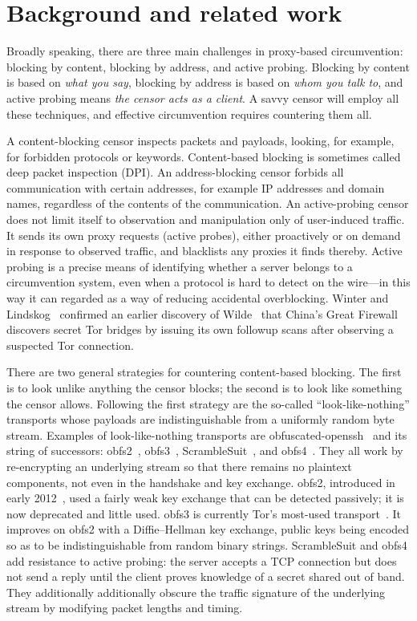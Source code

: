 \documentclass{sig-alternate}
\begin{document}
\section{Background and related work}
\label{sec:related-work}

Broadly speaking, there are three main challenges in proxy-based circumvention:
blocking by content, blocking by address, and active probing.
Blocking by content is based on \emph{what you say},
blocking by address is based on \emph{whom you talk to},
and active probing means \emph{the censor acts as a client}.
A savvy censor will employ all these techniques, and
effective circumvention requires countering them all.

A content-blocking censor inspects packets and payloads,
looking, for example, for forbidden protocols or keywords.
Content-based blocking is sometimes called deep packet inspection (DPI).
An address-blocking censor forbids all communication with certain
addresses, for example IP addresses and domain names, regardless of
the contents of the communication.
An active-probing censor does not limit itself to observation and manipulation
only of user-induced traffic.
It sends its own proxy requests (active probes),
either proactively or on demand in response to observed traffic,
and blacklists any proxies it finds thereby.
Active probing is a precise means of identifying whether a server belongs to a circumvention system,
even when a protocol is hard to detect on the wire---in this way it can
regarded as a way of reducing accidental overblocking.
Winter and Lindskog~\cite{foci12-winter} confirmed an earlier discovery of
Wilde~\cite{wilde} that China's Great Firewall discovers secret Tor bridges
by issuing its own followup scans after observing a suspected Tor connection.

There are two general strategies for countering content-based blocking.
The first is to look unlike anything the censor blocks;
the second is to look like something the censor allows.
Following the first strategy are the so-called ``look-like-nothing'' transports whose
payloads are indistinguishable from a uniformly random byte stream.
Examples of look-like-nothing transports are
obfuscated-openssh~\cite{obfuscated-openssh} and its string of successors:
obfs2~\cite{obfs2}, obfs3~\cite{obfs3}, ScrambleSuit~\cite{scramblesuit}, and obfs4~\cite{obfs4}.
They all work by re-encrypting
an underlying stream so that there remains no plaintext components,
not even in the handshake and key exchange.
obfs2, introduced in early 2012~\cite{obfsproxy-arms-race},
used a fairly weak key exchange that can be detected passively;
it is now deprecated and little used.
obfs3 is currently Tor's most-used transport~\cite{metrics-obfs3}.
It improves on obfs2 with a Diffie--Hellman key exchange,
public keys being encoded so as to be indistinguishable from random binary strings.
ScrambleSuit and obfs4 add resistance to active probing:
the server accepts a TCP connection but does not send a reply
until the client proves knowledge of a secret shared out of band.
They additionally additionally obscure the traffic signature of the underlying stream
by modifying packet lengths and timing.
\end{document}
